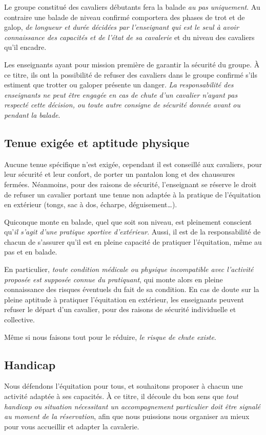 \documentclass[11pt,a4paper]{article}
\begin{document}
   Le groupe constitué des cavaliers débutants fera la balade \emph{au pas uniquement}.
   Au contraire une balade de niveau confirmé comportera des phases de trot et de galop, \emph{de longueur et durée décidées par l'enseignant qui est le seul à avoir connaissance des capacités et de l'état de sa cavalerie} et du niveau des cavaliers qu'il encadre.

   Les enseignants ayant pour mission première de garantir la sécurité du groupe.
   À ce titre, ils ont la possibilité de refuser des cavaliers dans le groupe confirmé s'ils estiment que trotter ou galoper présente un danger.
   \emph{La responsabilité des enseignants ne peut être engagée en cas de chute d'un cavalier n'ayant pas respecté cette décision, ou toute autre consigne de sécurité donnée avant ou pendant la balade}.

   \subsection*{Tenue exigée et aptitude physique}
   Aucune tenue spécifique n'est exigée, cependant il est conseillé aux cavaliers, pour leur sécurité et leur confort, de porter un pantalon long et des chaussures fermées.
   Néanmoins, pour des raisons de sécurité, l'enseignant se réserve le droit de refuser un cavalier portant une tenue non adaptée à la pratique de l'équitation en extérieur (tongs, sac à dos, écharpe, déguisement\dots).

   Quiconque monte en balade, quel que soit son niveau, est pleinement conscient qu'\emph{il s'agit d'une pratique sportive d'extérieur}.
   Aussi, il est de la responsabilité de chacun de s'assurer qu'il est en pleine capacité de pratiquer l'équitation, même au pas et en balade.

   En particulier, \emph{toute condition médicale ou physique incompatible avec l'activité proposée est supposée connue du pratiquant}, qui monte alors en pleine connaissance des risques éventuels du fait de sa condition.
   En cas de doute sur la pleine aptitude à pratiquer l'équitation en extérieur, les enseignants peuvent refuser le départ d'un cavalier, pour des raisons de sécurité individuelle et collective.

   Même si nous faisons tout pour le réduire, \emph{le risque de chute existe}.

   \subsection*{Handicap}
   Nous défendons l'équitation pour tous, et souhaitons proposer à chacun une activité adaptée à ses capacités.
   À ce titre, il découle du bon sens que \emph{tout handicap ou situation nécessitant un accompagnement particulier doit être signalé au moment de la réservation}, afin que nous puissions nous organiser au mieux pour vous accueillir et adapter la cavalerie.
\end{document}
